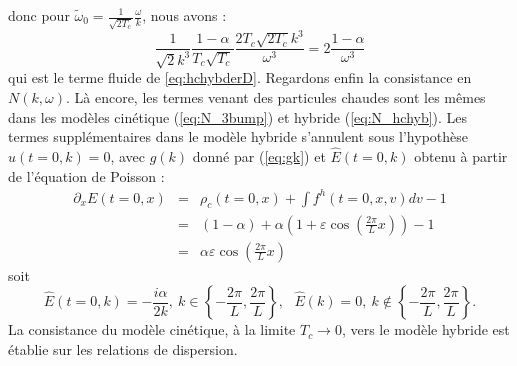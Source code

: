 donc pour $\tilde{\omega}_0=\frac{1}{\sqrt{2T_c}}\frac{\omega}{k}$, nous avons :
$$
  \frac{1}{\sqrt{2}k^3}\frac{1-\alpha}{T_c\sqrt{T_c}}\frac{2T_c\sqrt{2T_c}k^3}{\omega^3}=2\frac{1-\alpha}{\omega^3}
$$
qui est le terme fluide de \eqref{eq:hchybderD}. Regardons enfin la consistance en $N(k,\omega)$. Là encore, les termes venant des particules chaudes sont les mêmes dans les modèles cinétique (\ref{eq:N_3bump}) et hybride (\ref{eq:N_hchyb}). Les termes supplémentaires dans le modèle hybride s'annulent sous l'hypothèse $\hat{u}(t=0,k)=0$, avec $\hat{g}(k)$ donné par (\ref{eq:gk}) et $\hat{E}(t=0,k)$ obtenu à partir de l'équation de Poisson :
\begin{eqnarray*}
  \partial_xE(t=0,x)&=& \rho_c(t=0,x)+\int f^h(t=0,x,v)dv-1\\
                    &=& \left(1-\alpha\right)+\alpha\left(1+\varepsilon\cos\left(\frac{2\pi}{L}x\right)\right)-1\\
                    &=& \alpha\varepsilon\cos\left(\frac{2\pi}{L}x\right)
\end{eqnarray*}
soit
\begin{equation}
  \hat{E}\left(t=0,k\right)=-\frac{i\alpha}{2k},~k\in\left\{-\frac{2\pi}{L},\frac{2\pi}{L}\right\},~~~\hat{E}(k)=0,~k\notin\left\{-\frac{2\pi}{L},\frac{2\pi}{L}\right\}.
\label{eq:Ekbis}
\end{equation}
La consistance du modèle cinétique, à la limite $T_c\to 0$, vers le modèle hybride est établie sur les relations de dispersion.

